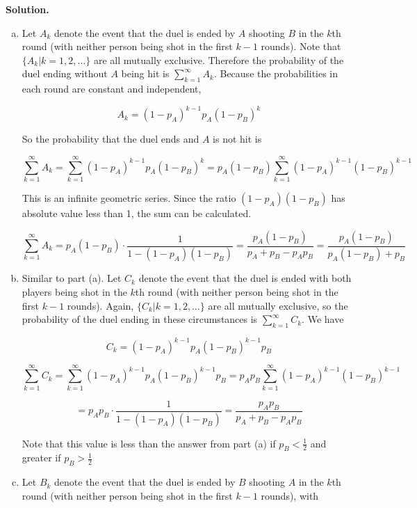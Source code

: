 \textbf{Solution.} \begin{enumerate}[(a)]

\item Let \(A_k\) denote the event that the duel is ended by \(A\) shooting \(B\) in the \(k\)th round (with neither person being shot in the first \(k - 1\) rounds). Note that \( \{A_k | k = 1, 2, \ldots\}\) are all mutually exclusive. Therefore the probability of the duel ending without \(A\) being hit is \(\sum_{k=1}^\infty A_k\). Because the probabilities in each round are constant and independent, 

\[
A_k = (1 - p_A)^{{k-1}}p_A(1 - p_B)^{k}
\]

So the probability that the duel ends and \(A\) is not hit is

\[
\sum_{k=1}^\infty A_k = \sum_{k=1}^\infty (1 - p_A)^{{k-1}}p_A(1 - p_B)^{k} = p_A (1 - p_B)\sum_{k=1}^\infty (1 - p_A)^{{k-1}}(1 - p_B)^{k-1} 
\]

This is an infinite geometric series. Since the ratio \((1 - p_A)(1 - p_B)\) has absolute value less than 1, the sum can be calculated.

\[
\sum_{k=1}^\infty A_k = p_A (1 - p_B) \cdot \frac{1}{1 - (1 - p_A)(1 - p_B)} = \frac{p_A (1 - p_B) }{p_A + p_B - p_Ap_B} = \boxed{\frac{p_A (1 - p_B) }{p_A(1 - p_B) + p_B}}
\]

\item Similar to part (a). Let \(C_k\) denote the event that the duel is ended with both players being shot in the \(k\)th round (with neither person being shot in the first \(k - 1\) rounds). Again, \( \{C_k | k = 1, 2, \ldots\}\) are all mutually exclusive, so the probability of the duel ending in these circumstances is \(\sum_{k=1}^\infty C_k\). We have

\[
C_k = (1 - p_A)^{{k-1}}p_A(1 - p_B)^{k-1}p_B
\]

\[
\sum_{k=1}^\infty C_k = \sum_{k=1}^\infty (1 - p_A)^{{k-1}}p_A(1 - p_B)^{k-1}p_B = p_A p_B\sum_{k=1}^\infty (1 - p_A)^{{k-1}}(1 - p_B)^{k-1} 
\]

\[
= p_A p_B \cdot \frac{1}{1 - (1 - p_A)(1 - p_B)} = \boxed{ \frac{p_A p_B }{p_A + p_B - p_Ap_B} }
\]

Note that this value is less than the answer from part (a) if \(p_B < \frac{1}{2}\) and greater if \(p_B > \frac{1}{2}\)

\item Let \(B_k\) denote the event that the duel is ended by \(B\) shooting \(A\) in the \(k\)th round (with neither person being shot in the first \(k - 1\) rounds), with


\end{enumerate}
